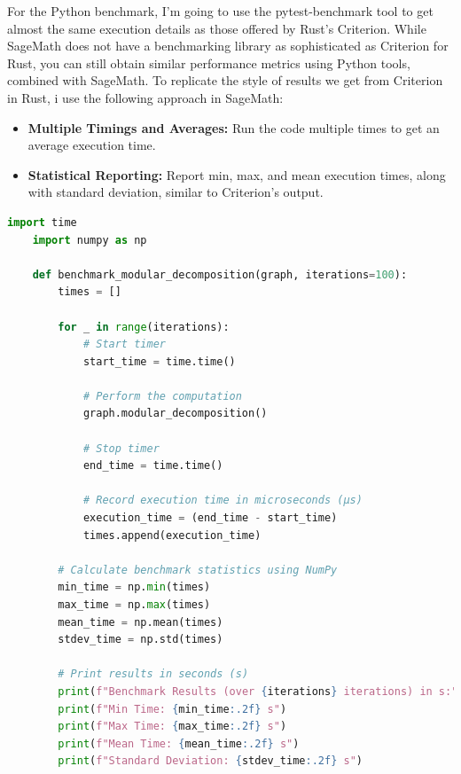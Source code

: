 For the Python benchmark, I'm going to use the pytest-benchmark\cite{pytestbenchmark} tool to get almost the same execution details as those offered by Rust's Criterion.
While SageMath does not have a benchmarking library as sophisticated as Criterion for Rust, you can still obtain similar performance metrics using Python tools, combined with SageMath.
To replicate the style of results we get from Criterion in Rust, i use the following approach in SageMath:
\begin{itemize}
    \item \textbf{Multiple Timings and Averages:} Run the code multiple times to get an average execution time.
    \item \textbf{Statistical Reporting:} Report min, max, and mean execution times, along with standard deviation, similar to Criterion’s output.
\end{itemize}

\begin{myex}

\end{myex}

\begin{lstlisting}[language=Python, style=python, caption={Example of benchmark code for modular decomposition}, label={lst:sagemath-example-of-benchmark-code}, firstnumber=1]
    import time
    import numpy as np

    def benchmark_modular_decomposition(graph, iterations=100):
        times = []

        for _ in range(iterations):
            # Start timer
            start_time = time.time()

            # Perform the computation
            graph.modular_decomposition()

            # Stop timer
            end_time = time.time()

            # Record execution time in microseconds (µs)
            execution_time = (end_time - start_time)
            times.append(execution_time)

        # Calculate benchmark statistics using NumPy
        min_time = np.min(times)
        max_time = np.max(times)
        mean_time = np.mean(times)
        stdev_time = np.std(times)

        # Print results in seconds (s)
        print(f"Benchmark Results (over {iterations} iterations) in s:")
        print(f"Min Time: {min_time:.2f} s")
        print(f"Max Time: {max_time:.2f} s")
        print(f"Mean Time: {mean_time:.2f} s")
        print(f"Standard Deviation: {stdev_time:.2f} s")
\end{lstlisting}


